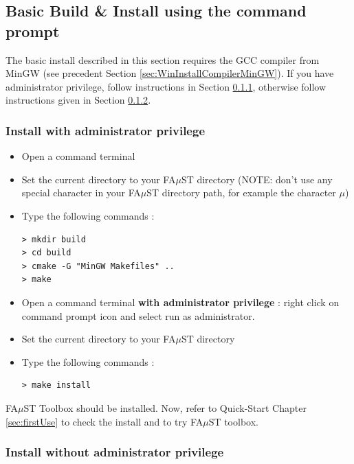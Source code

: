 \subsection{Basic Build \& Install using the command prompt}
\label{sec:WinMinGWBasicInstall}

The basic install described in this section requires the GCC compiler from MinGW (see precedent Section \ref{sec:WinInstallCompilerMinGW}).
If you have administrator privilege, follow instructions in Section \ref{sec:WinMinGWadminBasicInstall}, otherwise follow instructions given in Section \ref{sec:WinMinGWNoAdminBasicInstall}.
\subsubsection{Install with administrator privilege}
\label{sec:WinMinGWadminBasicInstall}

\begin{itemize}
\item Open a command terminal
\item Set the current directory to your FA$\mu$ST directory (NOTE: don't use any special character in your FA$\mu$ST directory path, for example the character $\mu$)
\item Type the following commands : 
\begin{lstlisting}
> mkdir build
> cd build
> cmake -G "MinGW Makefiles" .. 
> make
\end{lstlisting}

\item Open a command terminal \textbf{with administrator privilege} : right click on command prompt icon and select run as administrator. 
\item Set the current directory to your FA$\mu$ST directory
\item Type the following commands : 
\begin{lstlisting}
> make install 
\end{lstlisting}
\end{itemize}

FA$\mu$ST Toolbox should be installed. Now, refer to Quick-Start Chapter \ref{sec:firstUse} to check the install and to try FA$\mu$ST toolbox.


\subsubsection{Install without administrator privilege}
\label{sec:WinMinGWNoAdminBasicInstall}

